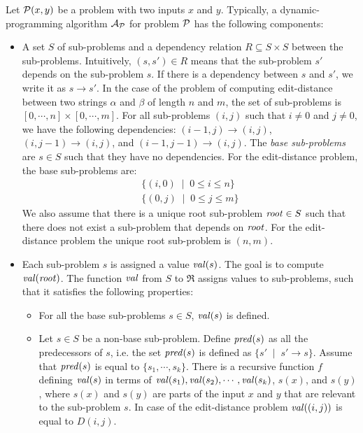 Let ${\cal P}(x,y)$ be a problem with two inputs $x$ and $y$. Typically,
a dynamic-programming algorithm ${\cal A}_{{\cal P}}$ for problem
${\cal P}$ has the following components:
\begin{itemize}
\item A set $S$ of sub-problems and a dependency relation $R\subseteq S\times S$
between the sub-problems. Intuitively, $(s,s')\in R$ means that the
sub-problem $s'$ depends on the sub-problem $s$. If there is a dependency
between $s$ and $s'$, we write it as $s\rightarrow s'$. In the
case of the problem of computing edit-distance between two strings
$\alpha$ and $\beta$ of length $n$ and $m$, the set of sub-problems
is $[0,\cdots,n]\times[0,\cdots,m]$. For all sub-problems $(i,j)$
such that $i\not=0$ and $j\not=0$, we have the following dependencies:
$(i-1,j)\rightarrow(i,j)$, $(i,j-1)\rightarrow(i,j)$, and $(i-1,j-1)\rightarrow(i,j)$.
The \textit{base sub-problems} are $s\in S$ such that they have no
dependencies. For the edit-distance problem, the base sub-problems
are: \[
\begin{array}{l}
\{(i,0)\;\mid\;0\leq i\leq n\}\\
\{(0,j)\;\mid\;0\leq j\leq m\}\end{array}\]
 We also assume that there is a unique root sub-problem ${\it root}\in S$
such that there does not exist a sub-problem that depends on ${\it root}$.
For the edit-distance problem the unique root sub-problem is $(n,m)$.
\item Each sub-problem $s$ is assigned a value ${\it val}(s)$. The goal
is to compute ${\it val}({\it root})$. The function ${\it val}$
from $S$ to $\Re$ assigns values to sub-problems, such that it satisfies
the following properties:

\begin{itemize}
\item For all the base sub-problems $s\in S$, ${\it val}(s)$ is defined.
\item Let $s\in S$ be a non-base sub-problem. Define ${\it pred}(s)$ as
all the predecessors of $s$, i.e. the set ${\it pred}(s)$ is defined
as $\{s'\;\mid\; s'\rightarrow s\}$. Assume that ${\it pred}(s)$
is equal to $\{s_{1},\cdots,s_{k}\}$. There is a recursive function
$f$ defining ${\it val}(s)$ in terms of ${\it val}(s_{1}),{\it val}(s_{2}),\cdots,{\it val}(s_{k})$,
$s(x)$, and $s(y)$, where $s(x)$ and $s(y)$ are parts of the input
$x$ and $y$ that are relevant to the sub-problem $s$. In case of
the edit-distance problem ${\it val}((i,j))$ is equal to $D(i,j)$. 
\end{itemize}
\end{itemize}
